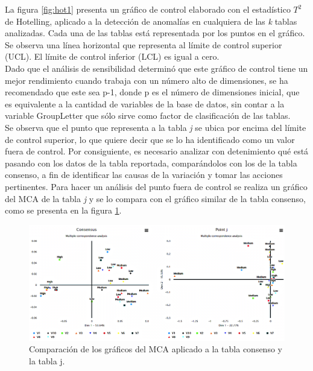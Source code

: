 \documentclass[water,article,submit,moreauthors,pdftex]{mdpi}
\begin{document}
La figura \ref{fig:hot1} presenta un gráfico de control elaborado con el
estadístico \(T^2\) de Hotelling, aplicado a la detección de anomalías
en cualquiera de las \emph{k} tablas analizadas. Cada una de las tablas
está representada por los puntos en el gráfico. Se observa una línea
horizontal que representa al límite de control superior (UCL). El límite
de control inferior (LCL) es igual a cero.\\
Dado que el análisis de sensibilidad determinó que este gráfico de
control tiene un mejor rendimiento cuando trabaja con un número alto de
dimensiones, se ha recomendado que este sea p-1, donde p es el número de
dimensiones inicial, que es equivalente a la cantidad de variables de la
base de datos, sin contar a la variable GroupLetter que sólo sirve como
factor de clasificación de las tablas.\\
Se observa que el punto que representa a la tabla \emph{j} se ubica por
encima del límite de control superior, lo que quiere decir que se lo ha
identificado como un valor fuera de control. Por consiguiente, es
necesario analizar con detenimiento qué está pasando con los datos de la
tabla reportada, comparándolos con los de la tabla consenso, a fin de
identificar las causas de la variación y tomar las acciones pertinentes.
Para hacer un análisis del punto fuera de control se realiza un gráfico
del MCA de la tabla \emph{j} y se lo compara con el gráfico similar de
la tabla consenso, como se presenta en la figura \ref{fig:conspoint}.

\begin{figure}[!ht]



\begin{center}\includegraphics[width=0.9\linewidth,]{conspoint} \end{center}

\caption{Comparación de los gráficos del MCA aplicado a la tabla consenso y la tabla j.}

\label{fig:conspoint}
\end{figure}
\end{document}

